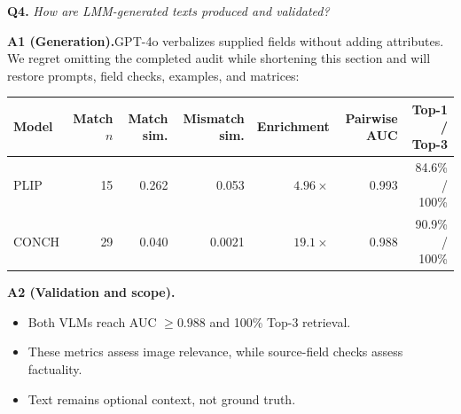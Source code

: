\documentclass[10pt]{article}
\newcommand{\questionsep}{\par\vspace{1.25em}}
\begin{document}
\questionsep
\textbf{Q4.}\quad
\textit{How are LMM-generated texts produced and validated?}

\textbf{A1 (Generation).}\enspace GPT-4o verbalizes supplied fields without adding attributes. We regret omitting
the completed audit while shortening this section and will restore prompts,
field checks, examples, and matrices:

\begin{center}
\begingroup
\scriptsize
\setlength{\tabcolsep}{2pt}
\renewcommand{\arraystretch}{1.08}
\begin{tabular*}{\linewidth}{@{\extracolsep{\fill}}lrrrrrr@{}}
\toprule
Model & Match \(n\) & Match sim. & Mismatch sim. & Enrichment &
Pairwise AUC & Top-1 / Top-3 \\
\midrule
PLIP & 15 & 0.262 & 0.053 & \(4.96{\times}\) & 0.993 & 84.6\% / 100\% \\
CONCH & 29 & 0.040 & 0.0021 & \(19.1{\times}\) & 0.988 & 90.9\% / 100\% \\
\bottomrule
\end{tabular*}
\endgroup
\end{center}

\textbf{A2 (Validation and scope).}
\begin{itemize}
\item Both VLMs reach AUC \(\geq 0.988\) and 100\% Top-3 retrieval.
\item These metrics assess image relevance, while source-field checks assess
factuality.
\item Text remains optional context, not ground truth.
\end{itemize}
\end{document}
